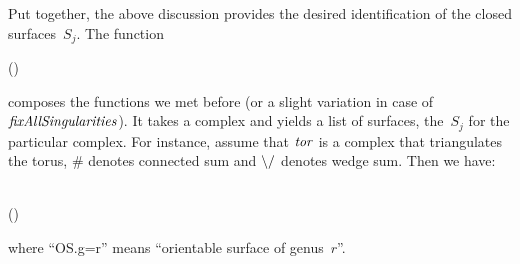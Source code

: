 Put together, the above discussion provides the desired identification of the
closed surfaces~$S_j$. The function
\begin{hscode}\SaveRestoreHook
{}%
%
\>[B]{}\mathbin{::}(\;)\Rightarrow {}\;\<[E]%
\\
\>[B]{}\mathrel{=}\;\mathbin{\circ}\mathbin{\circ}\<[E]%
\ColumnHook
\end{hscode}\resethooks
composes the functions we met before (or a slight variation in case of
\ensuremath{\Varid{fixAllSingularities}}). It takes a complex and yields a list of surfaces,
the~$S_j$ for the particular complex. For instance, assume that \ensuremath{\Varid{tor}} is a
complex that triangulates the torus, \ensuremath{\mathbin{\#}} denotes connected sum and \ensuremath{\mathbin{\char92 /}}
denotes wedge sum. Then we have:\begin{hscode}\SaveRestoreHook
{}%
%
%
%
\>[3]{}\;\<[38]%
\>[38]{}\qquad\mbox{\onelinecomment   [OS.g=1]}{}\<[E]%
\\
\>[3]{}\mathbin{\$}(\mathbin{\#})\<[38]%
\>[38]{}\qquad\mbox{\onelinecomment   [OS.g=2,OS.g=1]}{}\<[E]%
\ColumnHook
\end{hscode}\resethooks
where \enquote{OS.g=r} means \enquote{orientable surface of genus~$r$}.

